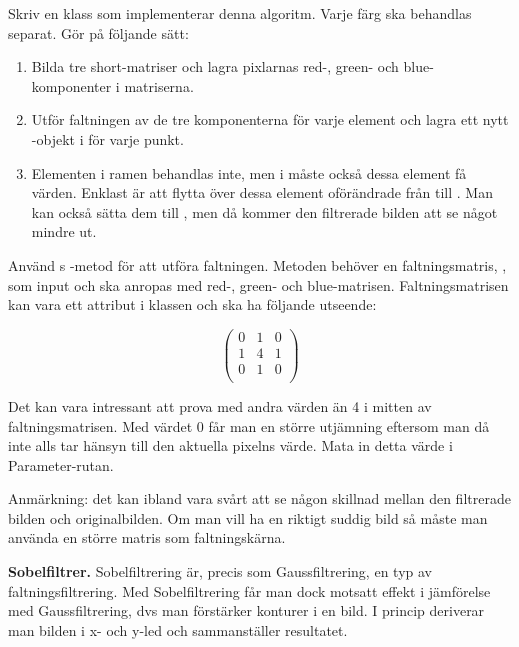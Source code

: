 Skriv en klass som implementerar denna algoritm. Varje färg ska behandlas separat. Gör på följande sätt:
\begin{enumerate}
	\item Bilda tre short-matriser och lagra pixlarnas red-, green- och blue-komponenter i matriserna.
	\item Utför faltningen av de tre komponenterna för varje element och lagra ett nytt -objekt i  för varje punkt.
	\item Elementen i ramen behandlas inte, men i  måste också dessa element få värden. Enklast är att flytta över dessa element oförändrade från  till . Man kan också sätta dem till , men då kommer den filtrerade bilden att se något mindre ut.
\end{enumerate}

Använd s -metod för att utföra faltningen. Metoden behöver en faltningsmatris, , som input och ska anropas med red-, green- och blue-matrisen. Faltningsmatrisen kan vara ett attribut i klassen och ska ha följande utseende:

\begin{displaymath}
\begin{pmatrix}
  0 & 1 & 0 \\
  1 & 4 & 1 \\
  0 & 1 & 0 \\
\end{pmatrix}
\end{displaymath}

Det kan vara intressant att prova med andra värden än 4 i mitten av faltningsmatrisen. Med värdet 0 får man en större utjämning eftersom man då inte alls tar hänsyn till den aktuella pixelns värde. Mata in detta värde i Parameter-rutan. 

Anmärkning: det kan ibland vara svårt att se någon skillnad mellan den filtrerade bilden och originalbilden. Om man vill ha en riktigt suddig bild så måste man använda en större matris som faltningskärna.


\Task  \textbf{Sobelfiltrer.} Sobelfiltrering är, precis som Gaussfiltrering, en typ av faltningsfiltrering. Med Sobelfiltrering får man dock motsatt effekt i jämförelse med Gaussfiltrering, dvs man förstärker konturer i en bild. I princip deriverar man bilden i x- och y-led och sammanställer resultatet.

